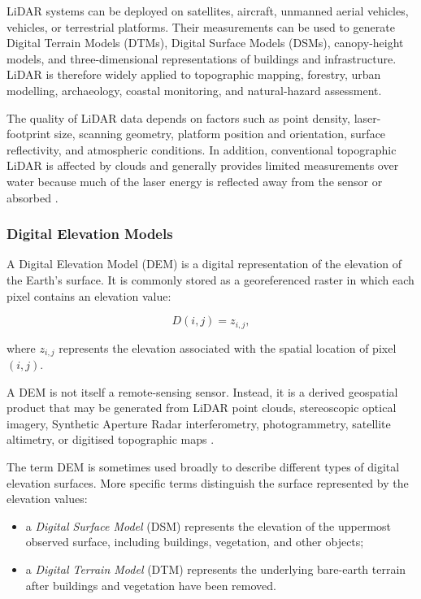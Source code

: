 \documentclass[11pt,a4paper]{article}
\begin{document}
LiDAR systems can be deployed on satellites, aircraft, unmanned aerial
vehicles, vehicles, or terrestrial platforms. Their measurements can be
used to generate Digital Terrain Models (DTMs), Digital Surface Models
(DSMs), canopy-height models, and three-dimensional representations of
buildings and infrastructure. LiDAR is therefore widely applied to
topographic mapping, forestry, urban modelling, archaeology, coastal
monitoring, and natural-hazard assessment.

The quality of LiDAR data depends on factors such as point density,
laser-footprint size, scanning geometry, platform position and
orientation, surface reflectivity, and atmospheric conditions. In
addition, conventional topographic LiDAR is affected by clouds and
generally provides limited measurements over water because much of the
laser energy is reflected away from the sensor or absorbed
\cite{usgs_lidar_data}.

\subsubsection{Digital Elevation Models}

A Digital Elevation Model (DEM) is a digital representation of the
elevation of the Earth's surface. It is commonly stored as a
georeferenced raster in which each pixel contains an elevation value:

\[
D(i,j) = z_{i,j},
\]

where \(z_{i,j}\) represents the elevation associated with the spatial
location of pixel \((i,j)\).

A DEM is not itself a remote-sensing sensor. Instead, it is a derived
geospatial product that may be generated from LiDAR point clouds,
stereoscopic optical imagery, Synthetic Aperture Radar interferometry,
photogrammetry, satellite altimetry, or digitised topographic maps
\cite{guth2021dem}.

The term DEM is sometimes used broadly to describe different types of
digital elevation surfaces. More specific terms distinguish the surface
represented by the elevation values:

\begin{itemize}
    \item a \textit{Digital Surface Model} (DSM) represents the elevation
    of the uppermost observed surface, including buildings, vegetation,
    and other objects;

    \item a \textit{Digital Terrain Model} (DTM) represents the underlying
    bare-earth terrain after buildings and vegetation have been removed.
\end{itemize}
\end{document}
